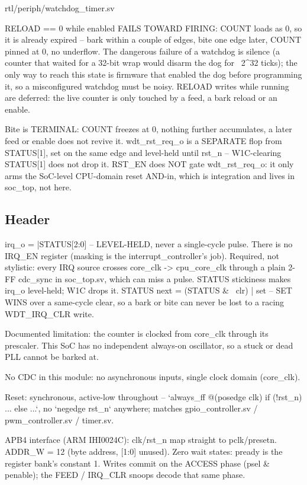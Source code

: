 \begin{relocated}{rtl/periph/watchdog_timer.sv}
\begin{textblock}
RELOAD == 0 while enabled FAILS TOWARD FIRING: COUNT loads as 0, so it is already expired --
bark within a couple of edges, bite one edge later, COUNT pinned at 0, no underflow. The
dangerous failure of a watchdog is silence (a counter that waited for a 32-bit wrap would
disarm the dog for ~2^32 ticks); the only way to reach this state is firmware that enabled the
dog before programming it, so a misconfigured watchdog must be noisy. RELOAD writes while
running are deferred: the live counter is only touched by a feed, a bark reload or an enable.

Bite is TERMINAL: COUNT freezes at 0, nothing further accumulates, a later feed or enable does
not revive it. wdt_rst_req_o is a SEPARATE flop from STATUS[1], set on the same edge and
level-held until rst_n -- W1C-clearing STATUS[1] does not drop it. RST_EN does NOT gate
wdt_rst_req_o: it only arms the SoC-level CPU-domain reset AND-in, which is integration and
lives in soc_top, not here.
\end{textblock}

\subsection*{Header}

\begin{textblock}
irq_o = |STATUS[2:0] -- LEVEL-HELD, never a single-cycle pulse. There is no IRQ_EN register
(masking is the interrupt_controller's job). Required, not stylistic: every IRQ source crosses
core_clk -> cpu_core_clk through a plain 2-FF cdc_sync in soc_top.sv, which can miss a pulse.
STATUS stickiness makes irq_o level-held; W1C drops it.
  STATUS next = (STATUS & ~clr) | set   -- SET WINS over a same-cycle clear, so a bark or bite
  can never be lost to a racing WDT_IRQ_CLR write.

Documented limitation: the counter is clocked from core_clk through its prescaler. This SoC has
no independent always-on oscillator, so a stuck or dead PLL cannot be barked at.

No CDC in this module: no asynchronous inputs, single clock domain (core_clk).

Reset: synchronous, active-low throughout -- `always_ff @(posedge clk) if (!rst_n) ... else
...`, no `negedge rst_n` anywhere; matches gpio_controller.sv / pwm_controller.sv / timer.sv.

APB4 interface (ARM IHI0024C): clk/rst_n map straight to pclk/presetn. ADDR_W = 12 (byte
address, [1:0] unused). Zero wait states: pready is the register bank's constant 1. Writes
commit on the ACCESS phase (psel & penable); the FEED / IRQ_CLR snoops decode that same phase.
\end{textblock}


\end{relocated}
